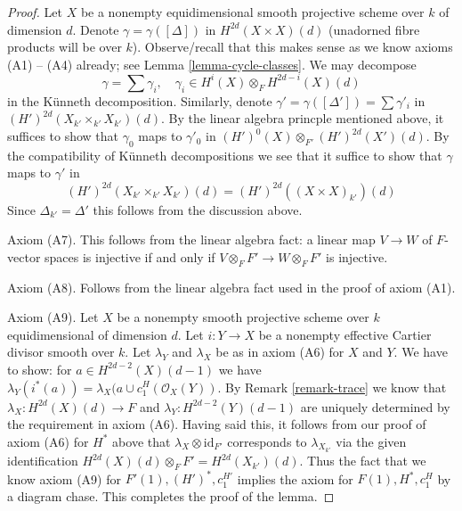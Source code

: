 \documentclass[10pt,a4paper]{amsart}
\theoremstyle{plain}
\theoremstyle{definition}
\theoremstyle{remark}
\numberwithin{equation}{subsection}
\begin{document}
\begin{proof}
\medskip\noindent
Let $X$ be a nonempty equidimensional smooth projective scheme
over $k$ of dimension $d$. Denote $\gamma = \gamma([\Delta])$
in $H^{2d}(X \times X)(d)$ (unadorned fibre products will be over $k$).
Observe/recall that this makes sense as we know axioms (A1) -- (A4) already;
see Lemma \ref{lemma-cycle-classes}. We may decompose
$$
\gamma = \sum \gamma_i, \quad
\gamma_i \in H^i(X) \otimes_F H^{2d - i}(X)(d)
$$
in the K\"unneth decomposition. Similarly, denote
$\gamma' = \gamma([\Delta']) = \sum \gamma'_i$
in $(H')^{2d}(X_{k'} \times_{k'} X_{k'})(d)$.
By the linear algebra princple mentioned above, it suffices
to show that $\gamma_0$ maps to $\gamma'_0$ in
$(H')^0(X) \otimes_{F'} (H')^{2d}(X')(d)$.
By the compatibility of K\"unneth decompositions
we see that it suffice to show that $\gamma$ maps to
$\gamma'$ in
$$
(H')^{2d}(X_{k'} \times_{k'} X_{k'})(d) = (H')^{2d}((X \times X)_{k'})(d)
$$
Since $\Delta_{k'} = \Delta'$ this follows from the discussion above.

\medskip\noindent
Axiom (A7). This follows from the linear algebra fact: a
linear map $V \to W$ of $F$-vector spaces is injective
if and only if $V \otimes_F F' \to W \otimes_F F'$ is injective.

\medskip\noindent
Axiom (A8). Follows from the linear algebra fact used in
the proof of axiom (A1).

\medskip\noindent
Axiom (A9). Let $X$ be a nonempty smooth projective scheme over $k$
equidimensional of dimension $d$. Let $i : Y \to X$ be a nonempty
effective Cartier divisor smooth over $k$.
Let $\lambda_Y$ and $\lambda_X$ be as in axiom (A6) for $X$ and $Y$.
We have to show: for $a \in H^{2d - 2}(X)(d - 1)$
we have $\lambda_Y(i^*(a)) = \lambda_X(a \cup c_1^H(\mathcal{O}_X(Y))$.
By Remark \ref{remark-trace}
we know that $\lambda_X : H^{2d}(X)(d) \to F$ and
$\lambda_Y : H^{2d - 2}(Y)(d - 1)$ are uniquely
determined by the requirement in axiom (A6).
Having said this, it follows from our proof of axiom (A6) for $H^*$ above
that $\lambda_X \otimes \text{id}_{F'}$ corresponds to $\lambda_{X_{k'}}$
via the given identification $H^{2d}(X)(d) \otimes_F F' = H^{2d}(X_{k'})(d)$.
Thus the fact that we know axiom (A9) for $F'(1), (H')^*, c_1^{H'}$
implies the axiom for $F(1), H^*, c_1^H$ by a diagram chase.
This completes the proof of the lemma.
\end{proof}
\end{document}
